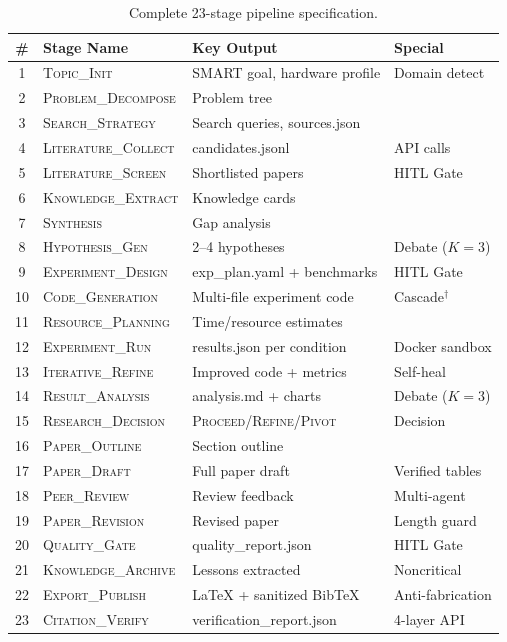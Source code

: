 \documentclass{llmxive}
\begin{document}
\begin{table}[!htbp]
\centering
\small
\begin{tabular}{@{}c l l l@{}}
\toprule
\textbf{\#} & \textbf{Stage Name} & \textbf{Key Output} & \textbf{Special} \\
\midrule
1 & \textsc{Topic\_Init} & SMART goal, hardware profile & Domain detect \\
2 & \textsc{Problem\_Decompose} & Problem tree & \\
3 & \textsc{Search\_Strategy} & Search queries, sources.json & \\
4 & \textsc{Literature\_Collect} & candidates.jsonl & API calls \\
5 & \textsc{Literature\_Screen} & Shortlisted papers & HITL Gate \\
6 & \textsc{Knowledge\_Extract} & Knowledge cards & \\
7 & \textsc{Synthesis} & Gap analysis & \\
8 & \textsc{Hypothesis\_Gen} & 2--4 hypotheses & Debate ($K{=}3$) \\
9 & \textsc{Experiment\_Design} & exp\_plan.yaml + benchmarks & HITL Gate \\
10 & \textsc{Code\_Generation} & Multi-file experiment code & Cascade$^\dagger$ \\
11 & \textsc{Resource\_Planning} & Time/resource estimates & \\
12 & \textsc{Experiment\_Run} & results.json per condition & Docker sandbox \\
13 & \textsc{Iterative\_Refine} & Improved code + metrics & Self-heal \\
14 & \textsc{Result\_Analysis} & analysis.md + charts & Debate ($K{=}3$) \\
15 & \textsc{Research\_Decision} & \textsc{Proceed}/\textsc{Refine}/\textsc{Pivot} & Decision \\
16 & \textsc{Paper\_Outline} & Section outline & \\
17 & \textsc{Paper\_Draft} & Full paper draft & Verified tables \\
18 & \textsc{Peer\_Review} & Review feedback & Multi-agent \\
19 & \textsc{Paper\_Revision} & Revised paper & Length guard \\
20 & \textsc{Quality\_Gate} & quality\_report.json & HITL Gate \\
21 & \textsc{Knowledge\_Archive} & Lessons extracted & Noncritical \\
22 & \textsc{Export\_Publish} & \LaTeX{} + sanitized BibTeX & Anti-fabrication \\
23 & \textsc{Citation\_Verify} & verification\_report.json & 4-layer API \\
\bottomrule
\end{tabular}
\vspace{0.3em}

\caption{Complete 23-stage pipeline specification.}
\label{tab:all_stages}
\end{table}
\end{document}
